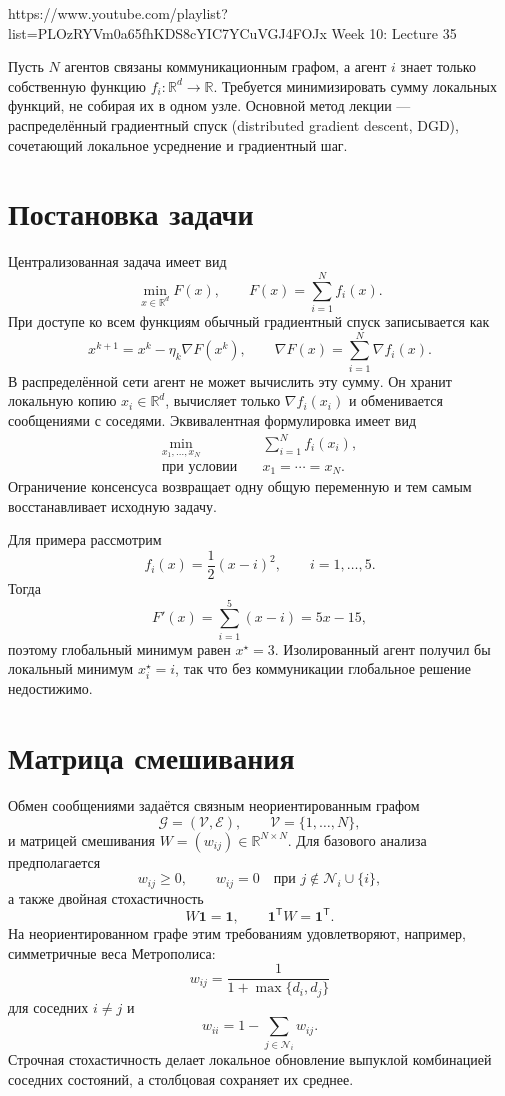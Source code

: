
\sourcevideo
    {https://www.youtube.com/playlist?list=PLOzRYVm0a65fhKDS8cYIC7YCuVGJ4FOJx}
    {Week 10: Lecture 35}

Пусть \(N\) агентов связаны коммуникационным графом, а агент \(i\)
знает только собственную функцию
\(f_i\colon\mathbb R^d\to\mathbb R\). Требуется минимизировать сумму
локальных функций, не собирая их в одном узле. Основной метод лекции
--- распределённый градиентный спуск (distributed gradient descent,
DGD), сочетающий локальное усреднение и градиентный шаг.

\section{Постановка задачи}

Централизованная задача имеет вид
\[
    \min_{x\in\mathbb R^d} F(x),
    \qquad
    F(x)=\sum_{i=1}^{N}f_i(x).
\]
При доступе ко всем функциям обычный градиентный спуск записывается как
\[
    x^{k+1}
    =
    x^k-\eta_k\nabla F(x^k),
    \qquad
    \nabla F(x)=\sum_{i=1}^{N}\nabla f_i(x).
\]
В распределённой сети агент не может вычислить эту сумму. Он хранит
локальную копию \(x_i\in\mathbb R^d\), вычисляет только
\(\nabla f_i(x_i)\) и обменивается сообщениями с соседями.
Эквивалентная формулировка имеет вид
\[
\begin{aligned}
    \min_{x_1,\ldots,x_N}\quad
    &\sum_{i=1}^{N}f_i(x_i),
    \\
    \text{при условии}\quad
    &x_1=\cdots=x_N.
\end{aligned}
\]
Ограничение консенсуса возвращает одну общую переменную и тем самым
восстанавливает исходную задачу.

Для примера рассмотрим
\[
    f_i(x)=\frac12(x-i)^2,
    \qquad i=1,\ldots,5.
\]
Тогда
\[
    F'(x)=\sum_{i=1}^{5}(x-i)=5x-15,
\]
поэтому глобальный минимум равен \(x^\star=3\). Изолированный агент
получил бы локальный минимум \(x_i^\star=i\), так что без коммуникации
глобальное решение недостижимо.

\section{Матрица смешивания}

Обмен сообщениями задаётся связным неориентированным графом
\[
    \mathcal G=(\mathcal V,\mathcal E),
    \qquad
    \mathcal V=\{1,\ldots,N\},
\]
и матрицей смешивания
\(W=(w_{ij})\in\mathbb R^{N\times N}\). Для базового анализа
предполагается
\[
    w_{ij}\ge0,
    \qquad
    w_{ij}=0
    \quad\text{при }j\notin\mathcal N_i\cup\{i\},
\]
а также двойная стохастичность
\[
    W\mathbf1=\mathbf1,
    \qquad
    \mathbf1^{\mathsf T}W=\mathbf1^{\mathsf T}.
\]
На неориентированном графе этим требованиям удовлетворяют, например,
симметричные веса Метрополиса:
\[
    w_{ij}
    =
    \frac{1}{1+\max\{d_i,d_j\}}
\]
для соседних \(i\ne j\) и
\[
    w_{ii}
    =
    1-\sum_{j\in\mathcal N_i}w_{ij}.
\]
Строчная стохастичность делает локальное обновление выпуклой
комбинацией соседних состояний, а столбцовая сохраняет их среднее.

